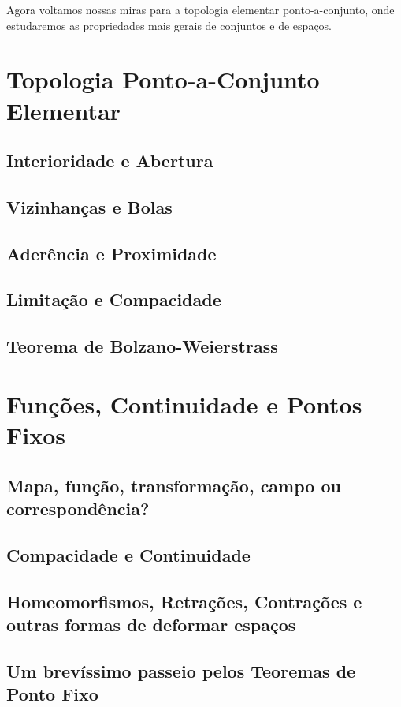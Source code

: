 Agora voltamos nossas miras para a topologia elementar ponto-a-conjunto, onde estudaremos as propriedades mais gerais de conjuntos e de espaços. 

\section{Topologia Ponto-a-Conjunto Elementar}
\label{segunda}




\subsection{Interioridade e Abertura}
\subsection{Vizinhanças e Bolas}
\subsection{Aderência e Proximidade}
\subsection{Limitação e Compacidade}
\subsection{Teorema de Bolzano-Weierstrass}


\section{Funções, Continuidade e Pontos Fixos}
\label{terceira}
\subsection{Mapa, função, transformação, campo ou correspondência?}
\subsection{Compacidade e Continuidade}
\subsection{Homeomorfismos, Retrações, Contrações e outras formas de deformar espaços}
\subsection{Um brevíssimo passeio pelos Teoremas de Ponto Fixo}
